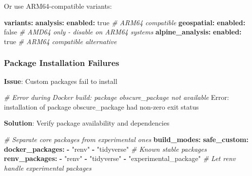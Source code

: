 \documentclass[
]{article}
\newenvironment{Shaded}{\begin{snugshade}}{\end{snugshade}}
\newcommand{\AttributeTok}[1]{\textcolor[rgb]{0.13,0.29,0.53}{#1}}
\newcommand{\CharTok}[1]{\textcolor[rgb]{0.31,0.60,0.02}{#1}}
\newcommand{\CommentTok}[1]{\textcolor[rgb]{0.56,0.35,0.01}{\textit{#1}}}
\newcommand{\ExtensionTok}[1]{#1}
\newcommand{\FunctionTok}[1]{\textcolor[rgb]{0.13,0.29,0.53}{\textbf{#1}}}
\newcommand{\KeywordTok}[1]{\textcolor[rgb]{0.13,0.29,0.53}{\textbf{#1}}}
\newcommand{\NormalTok}[1]{#1}
\newcommand{\StringTok}[1]{\textcolor[rgb]{0.31,0.60,0.02}{#1}}
\begin{document}
Or use ARM64-compatible variants:

\begin{Shaded}
\begin{Highlighting}[]
\FunctionTok{variants}\KeywordTok{:}
\AttributeTok{  }\FunctionTok{analysis}\KeywordTok{:}
\AttributeTok{    }\FunctionTok{enabled}\KeywordTok{:}\AttributeTok{ }\CharTok{true}\CommentTok{     \# ARM64 compatible}
\AttributeTok{  }\FunctionTok{geospatial}\KeywordTok{:}
\AttributeTok{    }\FunctionTok{enabled}\KeywordTok{:}\AttributeTok{ }\CharTok{false}\CommentTok{    \# AMD64 only {-} disable on ARM64 systems}
\AttributeTok{  }\FunctionTok{alpine\_analysis}\KeywordTok{:}
\AttributeTok{    }\FunctionTok{enabled}\KeywordTok{:}\AttributeTok{ }\CharTok{true}\CommentTok{     \# ARM64 compatible alternative}
\end{Highlighting}
\end{Shaded}

\subsubsection{Package Installation
Failures}\label{package-installation-failures}

\textbf{Issue}: Custom packages fail to install

\begin{Shaded}
\begin{Highlighting}[]
\CommentTok{\# Error during Docker build: package \textquotesingle{}obscure\_package\textquotesingle{} not available}
\ExtensionTok{Error:}\NormalTok{ installation of package }\StringTok{\textquotesingle{}obscure\_package\textquotesingle{}}\NormalTok{ had non{-}zero exit status}
\end{Highlighting}
\end{Shaded}

\textbf{Solution}: Verify package availability and dependencies

\begin{Shaded}
\begin{Highlighting}[]
\CommentTok{\# Separate core packages from experimental ones}
\FunctionTok{build\_modes}\KeywordTok{:}
\AttributeTok{  }\FunctionTok{safe\_custom}\KeywordTok{:}
\AttributeTok{    }\FunctionTok{docker\_packages}\KeywordTok{:}
\AttributeTok{      }\KeywordTok{{-}}\AttributeTok{ }\StringTok{"renv"}
\AttributeTok{      }\KeywordTok{{-}}\AttributeTok{ }\StringTok{"tidyverse"}\CommentTok{  \# Known stable packages}
\AttributeTok{    }\FunctionTok{renv\_packages}\KeywordTok{:}
\AttributeTok{      }\KeywordTok{{-}}\AttributeTok{ }\StringTok{"renv"}
\AttributeTok{      }\KeywordTok{{-}}\AttributeTok{ }\StringTok{"tidyverse"}
\AttributeTok{      }\KeywordTok{{-}}\AttributeTok{ }\StringTok{"experimental\_package"}\CommentTok{  \# Let renv handle experimental packages}
\end{Highlighting}
\end{Shaded}
\end{document}
